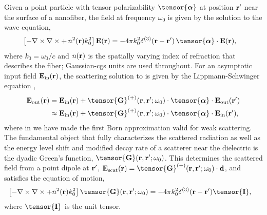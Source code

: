 \documentclass[preprint, aps,pra,onecolumn]{revtex4-1} %
\newcommand{\inp}{{\rm in}}
\newcommand{\out}{{\rm out}}
\newcommand{\unittens}{\tensor{\mathbf{I}}}
\begin{document}
Given a point particle with tensor polarizability $\tensor{\boldsymbol{\alpha}}$ at position $\mathbf{r}'$ near the surface of a nanofiber, the field  at frequency $\omega_0$ is given by the solution to the wave equation, 
	\begin{align}\label{Eq::WaveEquationSource}
		\left[ - \nabla\times\nabla\times + \, n^2(\br)k_0^2 \right] \mathbf{E}(\br) &= -4\pi  k_0^2 \delta^{(3)}(\br-\br')\,  \tensor{\boldsymbol{\alpha}}\cdot \mathbf{E}(\br),
	\end{align}
where $k_0=\omega_0/c$ and $n(\mathbf{r})$ is the spatially varying index of refraction that describes the fiber; Gaussian-cgs units are used throughout.  
For an asymptotic input field $\mathbf{E}_{\inp}(\br)$, the scattering solution to  is given by the Lippmann-Schwinger equation \cite{wubs_multiple-scattering_2004},
\begin{subequations}
	\begin{align}
		\mathbf{E}_{\out}(\br) &=\mathbf{E}_{\inp}(\br)+\tensor{\mathbf{G}}^{(+)}(\br , \br'; \omega_0)\cdot 
\tensor{\boldsymbol{\alpha}}\cdot \mathbf{E}_{\out}(\br')\\
		&\approx \mathbf{E}_{\inp}(\br)+ \tensor{\mathbf{G}}^{(+)}(\br , \br'; \omega_0) \cdot 
\tensor{\boldsymbol{\alpha}}\cdot \mathbf{E}_{\inp}(\br'), \label{Eq::ScatteredField}
	\end{align}
\end{subequations}
where in  we have made the first Born approximation valid for weak scattering. The fundamental object that fully characterizes the scattered radiation as well as the energy level shift and modified decay rate of a scatterer near the dielectric is the dyadic Green's function, $\tensor{\mathbf{G}}(\br, \br';\omega_0)$. This determines the scattered field from a point dipole at $\mathbf{r}'$, $\mathbf{E}_{\rm scat}(\br)= \tensor{\mathbf{G}}^{(+)}(\br , \br'; \omega_0)\cdot \mathbf{d}$, and satisfies the equation of motion,
	\begin{align} \label{Eq::GreensDiffEq}
		\left[ -\nabla\times\nabla\times + n^2(\mbf{r}) k_0^2 \right] \tensor{\mathbf{G}}(\br, \br';\omega_0) &= -4\pi 
k_0^2 \delta^{(3)}(\mathbf{r}-\mathbf{r}') \unittens,
	\end{align}
where $\unittens$ is the unit tensor.   
\end{document}
